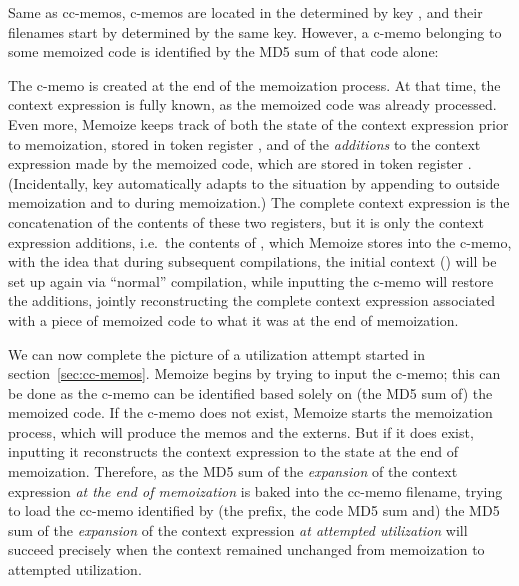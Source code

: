 \documentclass[a4paper,11pt]{article}
\begin{document}
Same as cc-memos, c-memos are located in the  determined
by key , and their filenames start by 
determined by the same key.  However, a c-memo belonging to some memoized code
is identified by the MD5 sum of that code alone:
\begin{center}
\end{center}

The c-memo is created at the end of the memoization process.  At that time, the
context expression is fully known, as the memoized code was already processed.
Even more, Memoize keeps track of both the state of the context expression
prior to memoization, stored in token register , and of the
\emph{additions} to the context expression made by the memoized code, which are
stored in token register .  (Incidentally, key
 automatically adapts to the situation by appending to
 outside memoization and to  during
memoization.)  The complete context expression is the concatenation of the
contents of these two registers, but it is only the context expression
additions, i.e.\ the contents of , which Memoize stores
into the c-memo, with the idea that during subsequent compilations, the initial
context () will be set up again via ``normal'' compilation,
while inputting the c-memo will restore the additions, jointly reconstructing
the complete context expression associated with a piece of memoized code to
what it was at the end of memoization.

We can now complete the picture of a utilization attempt started in
section~\ref{sec:cc-memos}.  Memoize begins by trying to input the c-memo; this
can be done as the c-memo can be identified based solely on (the MD5 sum of)
the memoized code.  If the c-memo does not exist, Memoize starts the
memoization process, which will produce the memos and the externs.  But if it
does exist, inputting it reconstructs the context expression to the state at
the end of memoization.  Therefore, as the MD5 sum of the \emph{expansion} of
the context expression \emph{at the end of memoization} is baked into the
cc-memo filename, trying to load the cc-memo identified by (the prefix, the
code MD5 sum and) the MD5 sum of the \emph{expansion} of the context expression
\emph{at attempted utilization} will succeed precisely when the context
remained unchanged from memoization to attempted utilization.
\end{document}
